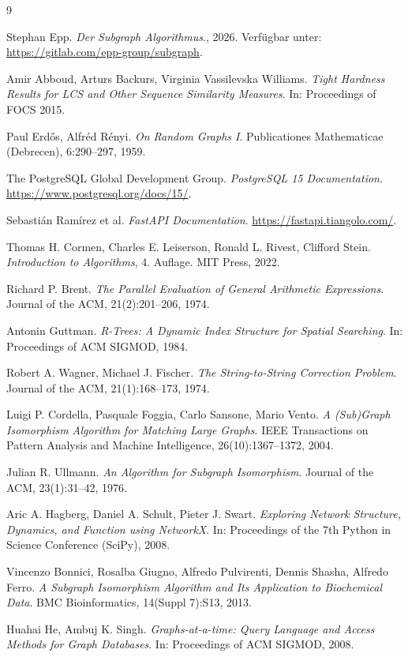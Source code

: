 \documentclass[a4paper,12pt]{article}
\theoremstyle{definition}
\begin{document}
\begin{thebibliography}{9}

Stephan Epp.
\emph{Der Subgraph Algorithmus}., 2026.
Verfügbar unter: \url{https://gitlab.com/epp-group/subgraph}.

Amir Abboud, Arturs Backurs, Virginia Vassilevska Williams.
\emph{Tight Hardness Results for LCS and Other Sequence Similarity Measures}.
In: Proceedings of FOCS 2015.

Paul Erdős, Alfréd Rényi.
\emph{On Random Graphs I}.
Publicationes Mathematicae (Debrecen), 6:290--297, 1959.

The PostgreSQL Global Development Group.
\emph{PostgreSQL 15 Documentation}.
\url{https://www.postgresql.org/docs/15/}.

Sebastián Ramírez et al.
\emph{FastAPI Documentation}.
\url{https://fastapi.tiangolo.com/}.

Thomas H. Cormen, Charles E. Leiserson, Ronald L. Rivest, Clifford Stein.
\emph{Introduction to Algorithms}, 4. Auflage.
MIT Press, 2022.

Richard P. Brent.
\emph{The Parallel Evaluation of General Arithmetic Expressions}.
Journal of the ACM, 21(2):201--206, 1974.

Antonin Guttman.
\emph{R-Trees: A Dynamic Index Structure for Spatial Searching}.
In: Proceedings of ACM SIGMOD, 1984.

Robert A. Wagner, Michael J. Fischer.
\emph{The String-to-String Correction Problem}.
Journal of the ACM, 21(1):168--173, 1974.

Luigi P. Cordella, Pasquale Foggia, Carlo Sansone, Mario Vento.
\emph{A (Sub)Graph Isomorphism Algorithm for Matching Large Graphs}.
IEEE Transactions on Pattern Analysis and Machine Intelligence, 26(10):1367--1372, 2004.

Julian R. Ullmann.
\emph{An Algorithm for Subgraph Isomorphism}.
Journal of the ACM, 23(1):31--42, 1976.

Aric A. Hagberg, Daniel A. Schult, Pieter J. Swart.
\emph{Exploring Network Structure, Dynamics, and Function using NetworkX}.
In: Proceedings of the 7th Python in Science Conference (SciPy), 2008.

Vincenzo Bonnici, Rosalba Giugno, Alfredo Pulvirenti, Dennis Shasha, Alfredo Ferro.
\emph{A Subgraph Isomorphism Algorithm and Its Application to Biochemical Data}.
BMC Bioinformatics, 14(Suppl 7):S13, 2013.

Huahai He, Ambuj K. Singh.
\emph{Graphs-at-a-time: Query Language and Access Methods for Graph Databases}.
In: Proceedings of ACM SIGMOD, 2008.

\end{thebibliography}
\end{document}
